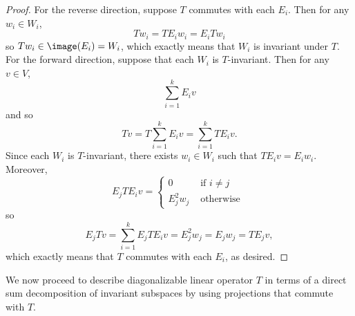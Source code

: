 \documentclass[linearalgebraII]{subfiles}
\begin{document}
    \begin{proof}
        For the reverse direction, suppose $T$ commutes with each $E_i$. Then for any $w_i\in W_i$,
        \begin{equation*}
            Tw_i = TE_iw_i = E_iTw_i
        \end{equation*}
        so $Tw_i\in \image(E_i) = W_i$, which exactly means that $W_i$ is invariant under $T$. For the forward direction, suppose that each $W_i$ is $T$-invariant. Then for any $v\in V$,
        \begin{equation*}
            \sum^{k}_{i=1} E_iv
        \end{equation*}
        and so
        \begin{equation*}
            Tv = T \sum^{k}_{i=1} E_iv = \sum^{k}_{i=1} TE_iv.
        \end{equation*}
        Since each $W_i$ is $T$-invariant, there exists $w_i\in W_i$ such that $TE_iv = E_iw_i$. Moreover,
        \begin{equation*}
            E_jTE_iv =
            \begin{cases}
                0 & \text{ if }i\neq j \\
                E_j^2w_j & \text{ otherwise }
            \end{cases}
        \end{equation*}
        so
        \begin{equation*}
            E_jTv = \sum^{k}_{i=1} E_jTE_iv = E_j^2w_j = E_jw_j = TE_jv,
        \end{equation*}
        which exactly means that $T$ commutes with each $E_i$, as desired.
    \end{proof}

    \begin{remark}
        We now proceed to describe diagonalizable linear operator $T$ in terms of a direct sum decomposition of invariant subspaces by using projections that commute with $T$.
    \end{remark}
\end{document}
